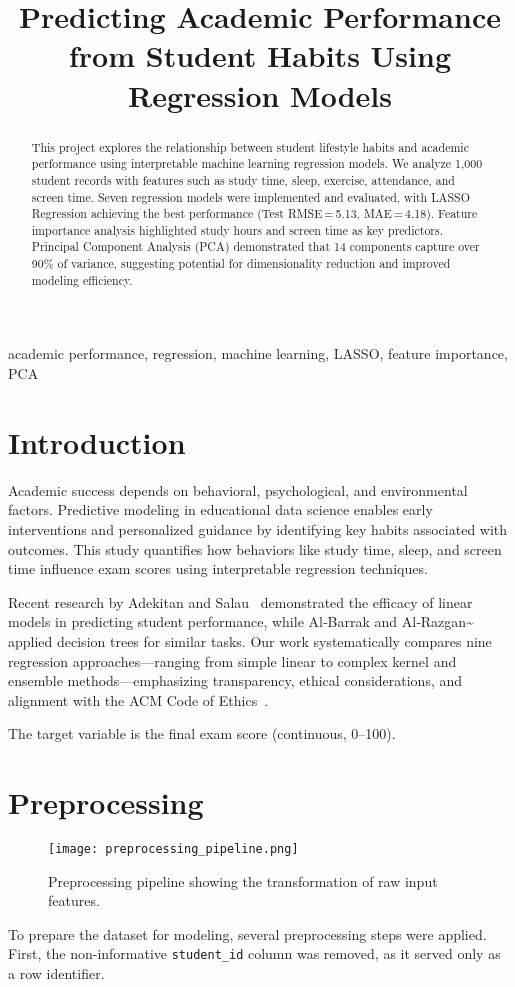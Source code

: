 \documentclass[conference]{IEEEtran}
\title{Predicting Academic Performance from Student Habits Using Regression Models}
\author{\IEEEauthorblockN{Quattro Roush}
  \IEEEauthorblockA{Department of Computer and Information Science\\
    Fordham University\\
    New York, USA\\
    mroush@fordham.edu}
}
\begin{document}
\maketitle

\begin{abstract}
This project explores the relationship between student lifestyle habits and academic performance using interpretable machine learning regression models. We analyze 1,000 student records with features such as study time, sleep, exercise, attendance, and screen time. Seven regression models were implemented and evaluated, with LASSO Regression achieving the best performance (Test RMSE\,=\,5.13, MAE\,=\,4.18). Feature importance analysis highlighted study hours and screen time as key predictors. Principal Component Analysis (PCA) demonstrated that 14 components capture over 90\% of variance, suggesting potential for dimensionality reduction and improved modeling efficiency.
\end{abstract}

\begin{IEEEkeywords}
academic performance, regression, machine learning, LASSO, feature importance, PCA
\end{IEEEkeywords}

\section{Introduction}
Academic success depends on behavioral, psychological, and environmental factors. Predictive modeling in educational data science enables early interventions and personalized guidance by identifying key habits associated with outcomes. This study quantifies how behaviors like study time, sleep, and screen time influence exam scores using interpretable regression techniques.

Recent research by Adekitan and Salau~\cite{adekitan2019} demonstrated the efficacy of linear models in predicting student performance, while Al‐Barrak and Al‐Razgan\textasciitilde\cite{albarrak2016} applied decision trees for similar tasks. Our work systematically compares nine regression approaches—ranging from simple linear to complex kernel and ensemble methods—emphasizing transparency, ethical considerations, and alignment with the ACM Code of Ethics~\cite{acm2018}.

The target variable is the final exam score (continuous, 0–100).

\section{Preprocessing}
\begin{figure}[htbp]
  \centering
  \texttt{[image: preprocessing\_pipeline.png]}
  \caption{Preprocessing pipeline showing the transformation of raw input features.}
  \label{fig:preproc_pipeline}
\end{figure}
To prepare the dataset for modeling, several preprocessing steps were applied. First, the non-informative \texttt{student\_id} column was removed, as it served only as a row identifier.
\end{document}
